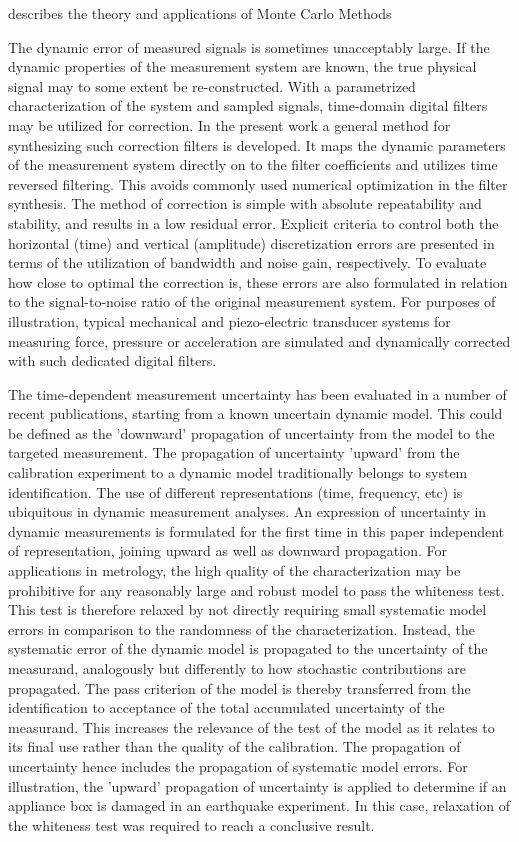 \documentclass[11pt]{article}
\begin{document}
\citet{Hammersley75} describes the theory and applications of  Monte Carlo Methods

\citet{Hessling08a} The dynamic error of measured signals is sometimes unacceptably large. If the dynamic properties of the measurement system are known, the true physical signal may to some extent be re-constructed. With a parametrized characterization of the system and sampled signals, time-domain digital filters may be utilized for correction. In the present work a general method for synthesizing such correction filters is developed. It maps the dynamic parameters of the measurement system directly on to the filter coefficients and utilizes time reversed filtering. This avoids commonly used numerical optimization in the filter synthesis. The method of correction is simple with absolute repeatability and stability, and results in a low residual error. Explicit criteria to control both the horizontal (time) and vertical (amplitude) discretization errors are presented in terms of the utilization of bandwidth and noise gain, respectively. To evaluate how close to optimal the correction is, these errors are also formulated in relation to the signal-to-noise ratio of the original measurement system. For purposes of illustration, typical mechanical and piezo-electric transducer systems for measuring force, pressure or acceleration are simulated and dynamically corrected with such dedicated digital filters.

\citet{Hessling11} The time-dependent measurement uncertainty has been evaluated in a number of recent publications, starting from a known uncertain dynamic model. This could be defined as the 'downward' propagation of uncertainty from the model to the targeted measurement. The propagation of uncertainty 'upward' from the calibration experiment to a dynamic model traditionally belongs to system identification. The use of different representations (time, frequency, etc) is ubiquitous in dynamic measurement analyses. An expression of uncertainty in dynamic measurements is formulated for the first time in this paper independent of representation, joining upward as well as downward propagation. For applications in metrology, the high quality of the characterization may be prohibitive for any reasonably large and robust model to pass the whiteness test. This test is therefore relaxed by not directly requiring small systematic model errors in comparison to the randomness of the characterization. Instead, the systematic error of the dynamic model is propagated to the uncertainty of the measurand, analogously but differently to how stochastic contributions are propagated. The pass criterion of the model is thereby transferred from the identification to acceptance of the total accumulated uncertainty of the measurand. This increases the relevance of the test of the model as it relates to its final use rather than the quality of the calibration. The propagation of uncertainty hence includes the propagation of systematic model errors. For illustration, the 'upward' propagation of uncertainty is applied to determine if an appliance box is damaged in an earthquake experiment. In this case, relaxation of the whiteness test was required to reach a conclusive result.
\end{document}
